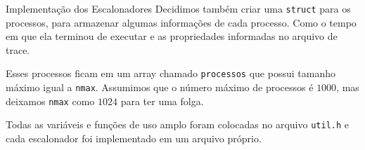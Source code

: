 \documentclass[10pt]{beamer}
\begin{document}
    \begin{frame}{Implementação dos Escalonadores}
        Decidimos também criar uma \texttt{struct} para os processos, para
        armazenar algumas informações de cada processo. Como o tempo em que ela terminou
        de executar e as propriedades informadas no arquivo de trace.

        Esses processos ficam em um array chamado \texttt{processos} que possui tamanho
        máximo igual a \texttt{nmax}. Assumimos que o número máximo de processos é
        $1000$, mas deixamos \texttt{nmax} como $1024$ para ter uma folga.

        Todas as variáveis e funções de uso amplo foram colocadas no arquivo
        \texttt{util.h} e cada escalonador foi implementado em um arquivo próprio.        
    \end{frame}
\end{document}

